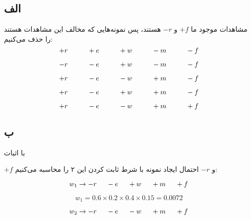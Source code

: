 \subsection*{الف}

مشاهدات موجود ما 
$+f$
و
$-r$
هستند، پس نمونه‌هایی که مخالف این مشاهدات هستند را حذف می‌کنیم:
$$
+r \hspace{+1cm} +e \hspace{+1cm} +w \hspace{+1cm} -m \hspace{+1cm} -f
$$

$$
-r \hspace{+1cm} -e \hspace{+1cm} +w \hspace{+1cm} -m \hspace{+1cm} -f
$$

$$
+r \hspace{+1cm} -e \hspace{+1cm} -w \hspace{+1cm} +m \hspace{+1cm} -f
$$

$$
+r \hspace{+1cm} -e \hspace{+1cm} +w \hspace{+1cm} +m \hspace{+1cm} -f
$$

$$
+r \hspace{+1cm} -e \hspace{+1cm} -w \hspace{+1cm} +m \hspace{+1cm} +f
$$

\subsection*{ب}

با اثبات

$+f$
و
$-r$
احتمال ایجاد نمونه با شرط ثابت کردن این ۲ را محاسبه می‌کنیم:

$$
w_1 \rightarrow -r \hspace{+0.5cm} -e \hspace{+0.5cm} +w \hspace{+0.5cm} +m \hspace{+0.5cm} +f
$$

$$
w_1 = 0.6 \times 0.2 \times 0.4 \times 0.15 = 0.0072
$$

$$
w_2 \rightarrow -r \hspace{+0.5cm} -e \hspace{+0.5cm} -w \hspace{+0.5cm} +m \hspace{+0.5cm} +f
$$

